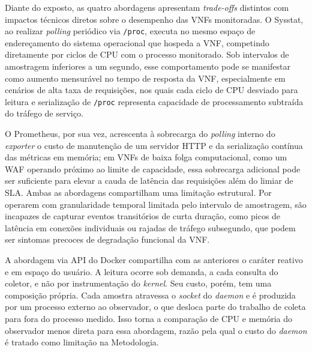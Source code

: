 Diante do exposto, as quatro abordagens apresentam \textit{trade-offs} distintos com impactos técnicos diretos sobre o desempenho das VNFs monitoradas. O Sysstat, ao realizar \textit{polling} periódico via \texttt{/proc}, executa no mesmo espaço de endereçamento do sistema operacional que hospeda a VNF, competindo diretamente por ciclos de CPU com o processo monitorado. Sob intervalos de amostragem inferiores a um segundo, esse comportamento pode se manifestar como aumento mensurável no tempo de resposta da VNF, especialmente em cenários de alta taxa de requisições, nos quais cada ciclo de CPU desviado para leitura e serialização de \texttt{/proc} representa capacidade de processamento subtraída do tráfego de serviço.

O Prometheus, por sua vez, acrescenta à sobrecarga do \textit{polling} interno do \textit{exporter} o custo de manutenção de um servidor HTTP e da serialização contínua das métricas em memória; em VNFs de baixa folga computacional, como um WAF operando próximo ao limite de capacidade, essa sobrecarga adicional pode ser suficiente para elevar a cauda de latência das requisições além do limiar de SLA. Ambas as abordagens compartilham uma limitação estrutural. Por operarem com granularidade temporal limitada pelo intervalo de amostragem, são incapazes de capturar eventos transitórios de curta duração, como picos de latência em conexões individuais ou rajadas de tráfego subsegundo, que podem ser sintomas precoces de degradação funcional da VNF.

A abordagem via API do Docker compartilha com as anteriores o caráter reativo e em espaço do usuário. A leitura ocorre sob demanda, a cada consulta do coletor, e não por instrumentação do \textit{kernel}. Seu custo, porém, tem uma composição própria. Cada amostra atravessa o \textit{socket} do \textit{daemon} e é produzida por um processo externo ao observador, o que desloca parte do trabalho de coleta para fora do processo medido. Isso torna a comparação de CPU e memória do observador menos direta para essa abordagem, razão pela qual o custo do \textit{daemon} é tratado como limitação na Metodologia.

